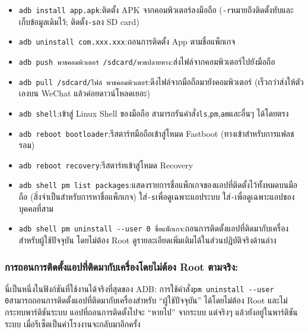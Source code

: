 \begin{itemize}
  \item \texttt{adb install app.\allowbreak apk}:ติดตั้ง APK จากคอมพิวเตอร์ลงมือถือ (\texttt{-\allowbreak r}หมายถึงติดตั้งทับและเก็บข้อมูลเดิมไว้; ติดตั้ง\texttt{-\allowbreak s}ลง SD card)
  \item \texttt{adb uninstall com.\allowbreak xxx.\allowbreak xxx}:ถอนการติดตั้ง App ตามชื่อแพ็กเกจ
  \item \texttt{adb push พาธคอมพิวเตอร์ /\allowbreak sdcard/\allowbreak พาธปลายทาง}:ส่งไฟล์จากคอมพิวเตอร์ไปยังมือถือ
  \item \texttt{adb pull /\allowbreak sdcard/\allowbreak ไฟล์ พาธคอมพิวเตอร์}:ดึงไฟล์จากมือถือมายังคอมพิวเตอร์ (เร็วกว่าส่งให้ตัวเองบน WeChat แล้วค่อยดาวน์โหลดเยอะ)
  \item \texttt{adb shell}:เข้าสู่ Linux Shell ของมือถือ สามารถรันคำสั่ง\texttt{ls},\texttt{pm},\texttt{am}และอื่นๆ ได้โดยตรง
  \item \texttt{adb reboot bootloader}:รีสตาร์ทมือถือเข้าสู่โหมด Fastboot (ทางเข้าสำหรับการแฟลชรอม)
  \item \texttt{adb reboot recovery}:รีสตาร์ทเข้าสู่โหมด Recovery
  \item \texttt{adb shell pm list packages}:แสดงรายการชื่อแพ็กเกจของแอปที่ติดตั้งไว้ทั้งหมดบนมือถือ (สิ่งจำเป็นสำหรับการหาชื่อแพ็กเกจ) ใส่\texttt{-\allowbreak s}เพื่อดูเฉพาะแอประบบ ใส่\texttt{-}เพื่อดูเฉพาะแอปของบุคคลที่สาม
  \item \texttt{adb shell pm uninstall -\allowbreak -\allowbreak user 0 ชื่อแพ็กเกจ}:ถอนการติดตั้งแอปที่ติดมากับเครื่องสำหรับผู้ใช้ปัจจุบัน โดยไม่ต้อง Root ดูรายละเอียดเพิ่มเติมได้ในส่วนปฏิบัติจริงด้านล่าง
\end{itemize}

\subsubsection*{การถอนการติดตั้งแอปที่ติดมากับเครื่องโดยไม่ต้อง Root ตามจริง:}

นี่เป็นหนึ่งในฟังก์ชันที่ใช้งานได้จริงที่สุดของ ADB: การใช้คำสั่ง\texttt{pm uninstall -\allowbreak -\allowbreak user 0}สามารถถอนการติดตั้งแอปที่ติดมากับเครื่องสำหรับ “ผู้ใช้ปัจจุบัน” ได้โดยไม่ต้อง Root และไม่กระทบพาร์ติชันระบบ แอปที่ถอนการติดตั้งไปจะ “หายไป” จากระบบ แต่จริงๆ แล้วยังอยู่ในพาร์ติชันระบบ เมื่อรีเซ็ตเป็นค่าโรงงานจะกลับมาอีกครั้ง

